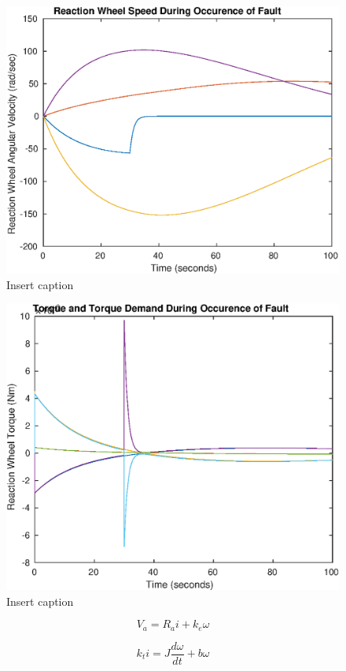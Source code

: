 \begin{figure}
	\centering
	\includegraphics[width=120mm]{figures/residOmega}
	\caption{Insert caption}
	\label{fig:residualOmega}
\end{figure} 

\begin{figure}
	\centering
	\includegraphics[width=120mm]{figures/residTau}
	\caption{Insert caption}
	\label{fig:residualTau}
\end{figure} 

\begin{equation}
V_a = R_a i + k_e \omega
\end{equation}

\begin{equation}
 k_{t}i  =J\dfrac{d\omega}{dt} + b\omega
\end{equation}


